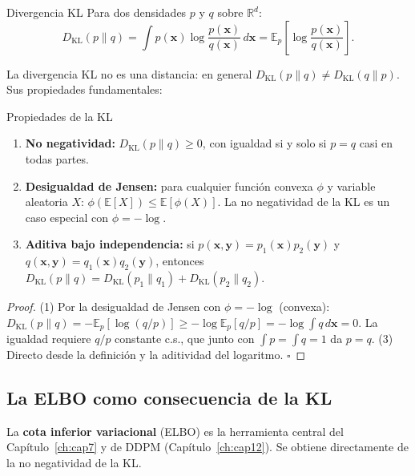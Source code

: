 \begin{definicion}{Divergencia KL}
\label{def:ap_kl}
Para dos densidades $p$ y $q$ sobre $\mathbb{R}^d$:
\begin{equation}
  D_{\mathrm{KL}}(p\|q)
  = \int p(\bm{x})\log\frac{p(\bm{x})}{q(\bm{x})}\,d\bm{x}
  = \mathbb{E}_p\!\left[\log\frac{p(\bm{x})}{q(\bm{x})}\right].
  \label{eq:ap_kl}
\end{equation}
\end{definicion}

La divergencia KL no es una distancia: en general $D_{\mathrm{KL}}(p\|q) \neq
D_{\mathrm{KL}}(q\|p)$. Sus propiedades fundamentales:

\begin{proposicion}{Propiedades de la KL}
\label{prop:ap_kl}
\begin{enumerate}
  \item \textbf{No negatividad:} $D_{\mathrm{KL}}(p\|q) \geq 0$, con igualdad
        si y solo si $p = q$ casi en todas partes.
  \item \textbf{Desigualdad de Jensen:} para cualquier función convexa $\phi$
        y variable aleatoria $X$: $\phi(\mathbb{E}[X]) \leq \mathbb{E}[\phi(X)]$.
        La no negatividad de la KL es un caso especial con $\phi = -\log$.
  \item \textbf{Aditiva bajo independencia:} si $p(\bm{x},\bm{y}) =
        p_1(\bm{x})p_2(\bm{y})$ y $q(\bm{x},\bm{y}) = q_1(\bm{x})q_2(\bm{y})$,
        entonces $D_{\mathrm{KL}}(p\|q) = D_{\mathrm{KL}}(p_1\|q_1) +
        D_{\mathrm{KL}}(p_2\|q_2)$.
\end{enumerate}
\end{proposicion}

\begin{proof}
(1) Por la desigualdad de Jensen con $\phi = -\log$ (convexa):
$D_{\mathrm{KL}}(p\|q) = -\mathbb{E}_p[\log(q/p)] \geq -\log\mathbb{E}_p[q/p]
= -\log\int q\,d\bm{x} = 0$.
La igualdad requiere $q/p$ constante c.s., que junto con $\int p = \int q = 1$
da $p = q$. (3) Directo desde la definición y la aditividad del logaritmo.
$\square$
\end{proof}

\subsection{La ELBO como consecuencia de la KL}
\label{subsec:ap_elbo}

La \textbf{cota inferior variacional} (ELBO) es la herramienta central del
Capítulo~\ref{ch:cap7} y de DDPM (Capítulo~\ref{ch:cap12}). Se obtiene
directamente de la no negatividad de la KL.

